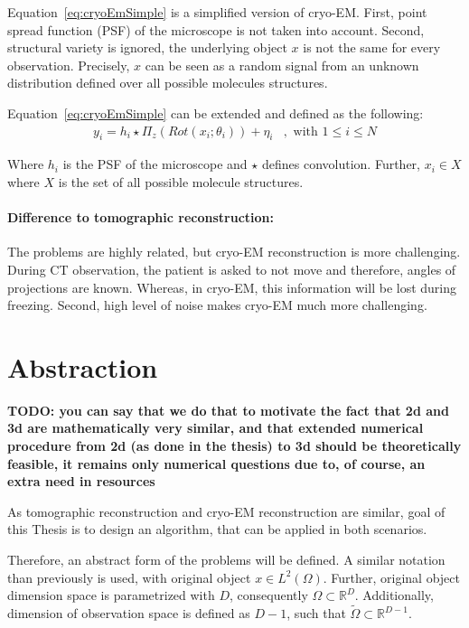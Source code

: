 Equation~\ref{eq:cryoEmSimple} is a simplified version of cryo-EM.
First, point spread function (PSF) of the microscope is not taken into account.
Second, structural variety is ignored, the underlying object $x$ is not the same 
for every observation. 
Precisely, $x$ can be seen as a random signal from an unknown distribution defined over all possible molecules structures.

Equation~\ref{eq:cryoEmSimple} can be extended and defined as the following:
\begin{equation}
    \label{eq:cryoEmExtended}
    \begin{aligned}
        y_i = h_i \star \Pi_z ( \textit{Rot} (x_i; \theta_i)) + \eta_i &, \text{ with } 1 \leq i \leq N    
    \end{aligned}
\end{equation}

Where $h_i$ is the PSF of the microscope and $\star$ defines convolution.
Further, $x_i \in X$ where $X$ is the set of all possible molecule structures.


\paragraph{Difference to tomographic reconstruction:}
The problems are highly related, but cryo-EM reconstruction is more challenging.
During CT observation, the patient is asked to not move and therefore, angles of projections are known.
Whereas, in cryo-EM, this information will be lost during freezing.
Second, high level of noise makes cryo-EM much more challenging.

\clearpage

\section{Abstraction}

\textbf{TODO:  you can say that we do that to motivate the fact that 2d and 3d are mathematically very similar,
and that extended numerical procedure from 2d 
(as done in the thesis) to 3d should be theoretically feasible, it remains only numerical questions due to, 
of course, an extra need in resources}

\label{sec:abstract_form}
As tomographic reconstruction and cryo-EM reconstruction are similar, 
goal of this Thesis is to design an algorithm, that can be applied in both scenarios.

Therefore, an abstract form of the problems will be defined.
A similar notation than previously is used, with original object $x \in L^2(\Omega)$.
Further, original object dimension space is parametrized with $D$, consequently $\Omega \subset \mathbb{R}^D$.
Additionally, dimension of observation space is defined as $D-1$, such that 
$\tilde{\Omega} \subset \mathbb{R}^{D-1}$.



